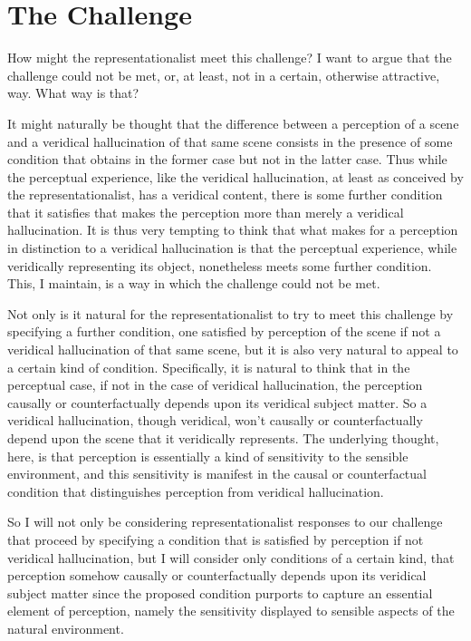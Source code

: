 \documentclass[12pt]{article}
\begin{document}

\section{The Challenge} %
\label{sec:the_challenge}

How might the representationalist meet this challenge? I want to argue that the challenge could not be met, or, at least, not in a certain, otherwise attractive, way. What way is that?

It might naturally be thought that the difference between a perception of a scene and a veridical hallucination of that same scene consists in the presence of some condition that obtains in the former case but not in the latter case. Thus while the perceptual experience, like the veridical hallucination, at least as conceived by the representationalist, has a veridical content, there is some further condition that it satisfies that makes the perception more than merely a veridical hallucination. It is thus very tempting to think that what makes for a perception in distinction to a veridical hallucination is that the perceptual experience, while veridically representing its object, nonetheless meets some further condition. This, I maintain, is a way in which the challenge could not be met.

Not only is it natural for the representationalist to try to meet this challenge by specifying a further condition, one satisfied by perception of the scene if not a veridical hallucination of that same scene, but it is also very natural to appeal to a certain kind of condition. Specifically, it is natural to think that in the perceptual case, if not in the case of veridical hallucination, the perception causally or counterfactually depends upon its veridical subject matter. So a veridical hallucination, though veridical, won't causally or counterfactually depend upon the scene that it veridically represents. The underlying thought, here, is that perception is essentially a kind of sensitivity to the sensible environment, and this sensitivity is manifest in the causal or counterfactual condition that distinguishes perception from veridical hallucination.

So I will not only be considering representationalist responses to our challenge that proceed by specifying a condition that is satisfied by perception if not veridical hallucination, but I will consider only conditions of a certain kind, that perception somehow causally or counterfactually depends upon its veridical subject matter since the proposed condition purports to capture an essential element of perception, namely the sensitivity displayed to sensible aspects of the natural environment.
\end{document}

